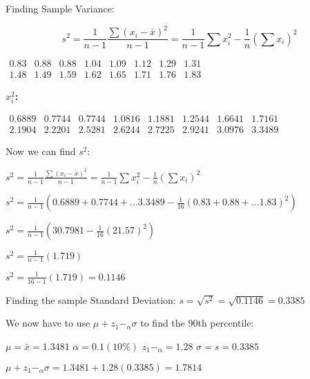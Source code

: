 \documentclass{article}
\begin{document}
Finding Sample Variance:

$$s^2=\frac{1}{n-1}\frac{\sum(x_{i}-\bar{x})^2}{n-1}= \frac{1}{n-1}\sum x_{i}^{2} -\frac{1}{n}(\sum x_{i})^2$$

\newpage

$\begin{matrix}
0.83 & 0.88 & 0.88 & 1.04 & 1.09 &1.12 & 1.29 & 1.31 \\

1.48 & 1.49 & 1.59 & 1.62 & 1.65 & 1.71 & 1.76 & 1.83

\end{matrix}$

  \vspace{3mm}

\textbf{$x_{i}^{2}$:}
  \vspace{2mm}

$\begin{matrix}
0.6889 & 0.7744 & 0.7744 & 1.0816 & 1.1881 & 1.2544 & 1.6641 & 1.7161 \\

2.1904 & 2.2201 & 2.5281 & 2.6244 & 2.7225 & 2.9241 & 3.0976 & 3.3489

\end{matrix}$
\vspace{3mm}

Now we can find $s^2$:
\vspace{3mm}

$s^2=\frac{1}{n-1}\frac{\sum(x_{i}-\bar{x})^2}{n-1}= \frac{1}{n-1}\sum x_{i}^{2} -\frac{1}{n}(\sum x_{i})^2$

$s^2=\frac{1}{n-1}(0.6889+0.7744+...3.3489-\frac{1}{16} (0.83+0.88+...1.83)^2) $

$s^2=\frac{1}{n-1}(30.7981-\frac{1}{16}(21.57)^2)$

$s^2=\frac{1}{n-1}(1.719)$

$s^2=\frac{1}{16-1}(1.719)=0.1146$

\vspace{3mm}
Finding the sample Standard Deviation: $s=\sqrt{s^2}=\sqrt{0.1146}=0.3385$

\vspace{2mm}

We now have to use $\mu +z_{1}-_{\alpha}\sigma$ to find the 90th percentile:  

\vspace{2mm}
  
  $\mu=\bar{x}=1.3481$
  $\alpha=0.1 (10\%)$
  $z_{1}-_{\alpha}=1.28$
  $\sigma=s=0.3385$
  
  $\mu +z_{1}-_{\alpha}\sigma=1.3481+1.28(0.3385)=1.7814$
  
\end{document}
